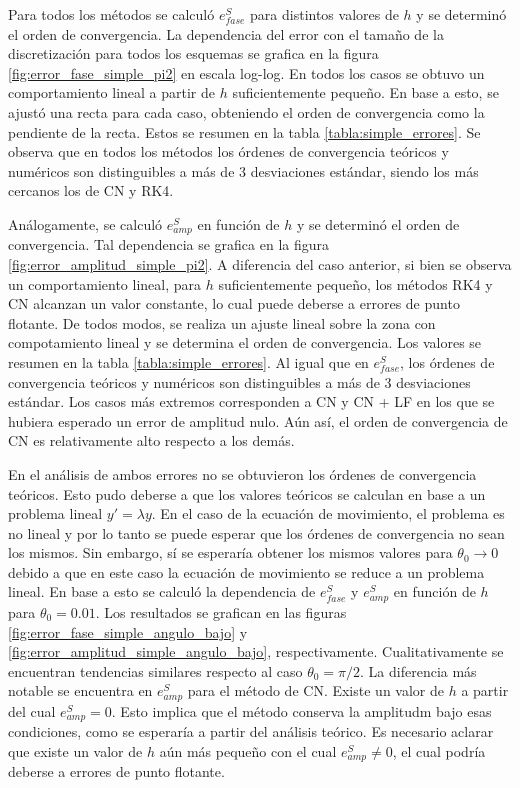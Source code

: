 \documentclass[aps,prb,twocolumn,superscriptaddress,floatfix,longbibliography,10pt]{revtex4-2}
\newcounter{para}
\begin{document}
Para todos los métodos se calculó $e^S_{fase}$ para distintos valores de $h$ y se determinó el orden de convergencia. La dependencia del error con el tamaño de la discretización para todos los esquemas se grafica en la figura \ref{fig:error_fase_simple_pi2} en escala log-log. En todos los casos se obtuvo un comportamiento lineal a partir de $h$ suficientemente pequeño. En base a esto, se ajustó una recta para cada caso, obteniendo el orden de convergencia como la pendiente de la recta. Estos se resumen en la tabla \ref{tabla:simple_errores}. Se observa que en todos los métodos los órdenes de convergencia teóricos y numéricos son distinguibles a más de 3 desviaciones estándar, siendo los más cercanos los de CN y RK4.


Análogamente, se calculó $e^S_{amp}$ en función de $h$ y se determinó el orden de convergencia. Tal dependencia se grafica en la figura \ref{fig:error_amplitud_simple_pi2}. A diferencia del caso anterior, si bien se observa un comportamiento lineal, para $h$ suficientemente pequeño, los métodos RK4 y CN alcanzan un valor constante, lo cual puede deberse a errores de punto flotante. De todos modos, se realiza un ajuste lineal sobre la zona con compotamiento lineal y se determina el orden de convergencia. Los valores se resumen en la tabla \ref{tabla:simple_errores}. Al igual que en $e^S_{fase}$, los órdenes de convergencia teóricos y numéricos son distinguibles a más de 3 desviaciones estándar. Los casos más extremos corresponden a CN y CN + LF en los que se hubiera esperado un error de amplitud nulo. Aún así, el orden de convergencia de CN es relativamente alto respecto a los demás.


En el análisis de ambos errores no se obtuvieron los órdenes de convergencia teóricos. Esto pudo deberse a que los valores teóricos se calculan en base a un problema lineal $y' = \lambda y$. En el caso de la ecuación de movimiento, el problema es no lineal y por lo tanto se puede esperar que los órdenes de convergencia no sean los mismos. Sin embargo, sí se esperaría obtener los mismos valores para $\theta_0 \rightarrow 0$ debido a que en este caso la ecuación de movimiento se reduce a un problema lineal. En base a esto se calculó la dependencia de $e^S_{fase}$ y $e^S_{amp}$ en función de $h$ para $\theta_0 = 0.01$. Los resultados se grafican en las figuras \ref{fig:error_fase_simple_angulo_bajo} y \ref{fig:error_amplitud_simple_angulo_bajo}, respectivamente. Cualitativamente se encuentran tendencias similares respecto al caso $\theta_0 = \pi/2$. La diferencia más notable se encuentra en $e^S_{amp}$ para el método de CN. Existe un valor de $h$ a partir del cual $e^S_{amp} = 0$. Esto implica que el método conserva la amplitudm bajo esas condiciones, como se esperaría a partir del análisis teórico. Es necesario aclarar que existe un valor de $h$ aún más pequeño con el cual $e^S_{amp} \neq 0$, el cual podría deberse a errores de punto flotante.
\end{document}
